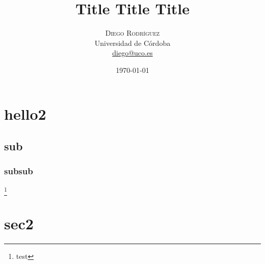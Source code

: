 \documentclass[twoside,twocolumn]{article}
\title{Title Title Title}
\date{\today}
\author{
    \textsc{Diego Rodríguez} \\
    \normalsize Universidad de Córdoba \\
    \normalsize \href{mailto:diego@uco.es}{diego@uco.es}
}
\begin{document}
\maketitle
\section{hello2}
    \blindtext
    \paragraph{}\blindtext
    \subsection{sub}
        \blindtext
        \subsubsection{subsub}
            \blindtext \footnote{test}
\section{sec2}
    \blindtext
    \paragraph{}\blindtext
    \paragraph{}\blindtext
    \paragraph{}\blindtext
\end{document}

